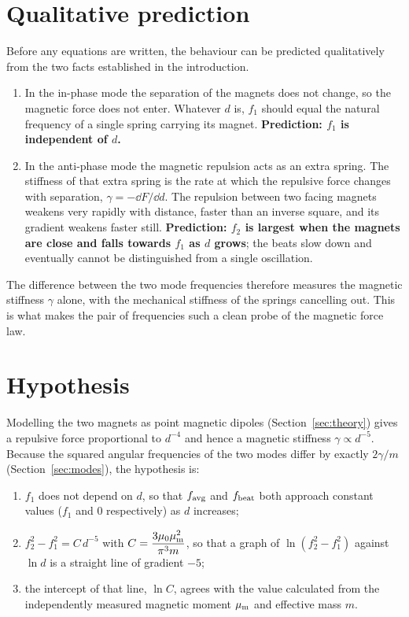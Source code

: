 \section{Qualitative prediction}

Before any equations are written, the behaviour can be predicted qualitatively from the two facts established in the introduction.

\begin{enumerate}
\item In the in-phase mode the separation of the magnets does not change, so the magnetic force does not enter. Whatever $d$ is, $f_1$ should equal the natural frequency of a single spring carrying its magnet. \textbf{Prediction: $f_1$ is independent of $d$.}
\item In the anti-phase mode the magnetic repulsion acts as an extra spring. The stiffness of that extra spring is the rate at which the repulsive force changes with separation, $\gamma=-\dd F/\dd d$. The repulsion between two facing magnets weakens very rapidly with distance, faster than an inverse square, and its gradient weakens faster still. \textbf{Prediction: $f_2$ is largest when the magnets are close and falls towards $f_1$ as $d$ grows}; the beats slow down and eventually cannot be distinguished from a single oscillation.
\end{enumerate}

The difference between the two mode frequencies therefore measures the magnetic stiffness $\gamma$ alone, with the mechanical stiffness of the springs cancelling out. This is what makes the pair of frequencies such a clean probe of the magnetic force law.

\section{Hypothesis}

Modelling the two magnets as point magnetic dipoles (Section~\ref{sec:theory}) gives a repulsive force proportional to $d^{-4}$ and hence a magnetic stiffness $\gamma\propto d^{-5}$. Because the squared angular frequencies of the two modes differ by exactly $2\gamma/m$ (Section~\ref{sec:modes}), the hypothesis is:

\begin{keybox}
\begin{enumerate}[label=(\roman*)]
\item $f_1$ does not depend on $d$, so that $f_{\rm avg}$ and $f_{\rm beat}$ both approach constant values ($f_1$ and $0$ respectively) as $d$ increases;
\item $f_2^2-f_1^2=C\,d^{-5}$ with $C=\dfrac{3\mu_0\mu_{\mathrm m}^2}{\pi^3 m}$, so that a graph of $\ln(f_2^2-f_1^2)$ against $\ln d$ is a straight line of gradient $-5$;
\item the intercept of that line, $\ln C$, agrees with the value calculated from the independently measured magnetic moment $\mu_{\mathrm m}$ and effective mass $m$.
\end{enumerate}
\end{keybox}

